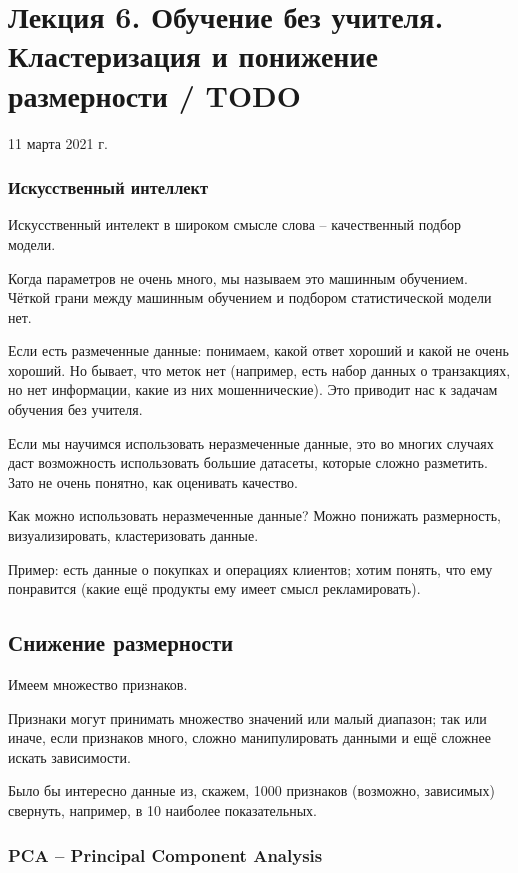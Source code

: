\documentclass[main.tex]{subfiles}
\begin{document}
\section{ Лекция 6. Обучение без учителя. Кластеризация и понижение размерности / TODO }
11 марта 2021 г.

\subsubsection{Искусственный интеллект}

Искусственный интелект в широком смысле слова -- качественный подбор модели.

Когда параметров не очень много, мы называем это машинным обучением.
Чёткой грани между машинным обучением и подбором статистической модели нет.

Если есть размеченные данные: понимаем, какой ответ хороший и какой не очень хороший.
Но бывает, что меток нет (например, есть набор данных о транзакциях, но нет информации, какие из них мошеннические).
Это приводит нас к задачам обучения без учителя.

Если мы научимся использовать неразмеченные данные, это во многих случаях даст возможность использовать большие датасеты, которые сложно разметить.
Зато не очень понятно, как оценивать качество.

Как можно использовать неразмеченные данные?
Можно понижать размерность, визуализировать, кластеризовать данные.

Пример: есть данные о покупках и операциях клиентов; хотим понять, что ему понравится (какие ещё продукты ему имеет смысл рекламировать).

\subsection{Снижение размерности }
Имеем множество признаков.

Признаки могут принимать множество значений или малый диапазон; так или иначе, если признаков много, сложно манипулировать данными и ещё сложнее искать зависимости.

Было бы интересно данные из, скажем, 1000 признаков (возможно, зависимых) свернуть, например, в 10 наиболее показательных.

\subsubsection{PCA -- Principal Component Analysis}
\end{document}
